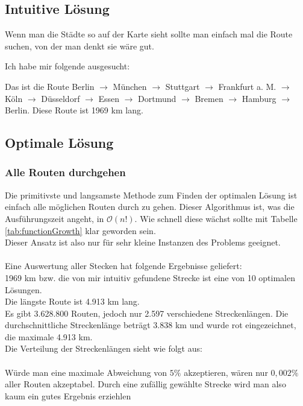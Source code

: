 \documentclass[a4paper,9pt]{scrartcl}
\begin{document}
  \subsection{Intuitive Lösung}
    Wenn man die Städte so auf der Karte sieht sollte man einfach mal die Route
    suchen, von der man denkt sie wäre gut. \\
    \begin{center}
    \end{center}
    Ich habe mir folgende ausgesucht:\\
    \begin{center}
    \end{center}
    Das ist die Route Berlin $\rightarrow$ München $\rightarrow$ Stuttgart
    $\rightarrow$ Frankfurt a. M. $\rightarrow$ Köln $\rightarrow$ Düsseldorf
    $\rightarrow$ Essen $\rightarrow$ Dortmund $\rightarrow$ Bremen
    $\rightarrow$ Hamburg $\rightarrow$ Berlin.
    Diese Route ist 1969 km lang.

  \newpage
  \subsection{Optimale Lösung}
  \subsubsection{Alle Routen durchgehen}
    Die primitivste und langsamste Methode zum Finden der optimalen Lösung ist
    einfach alle möglichen Routen durch zu gehen. Dieser Algorithmus ist, was
    die Ausführungszeit angeht, in $\mathcal{O}(n!)$. Wie schnell diese wächst
    sollte mit Tabelle \ref{tab:functionGrowth} klar geworden sein.\\
    Dieser Ansatz ist also nur für sehr kleine Instanzen des Problems geeignet.\\
    \\
    Eine Auswertung aller Stecken hat folgende Ergebnisse geliefert: \\
    1969 km bzw. die von mir intuitiv gefundene Strecke ist eine von 10 optimalen Lösungen.\\
    Die längste Route ist 4.913 km lang.\\
    Es gibt 3.628.800 Routen, jedoch nur 2.597 verschiedene Streckenlängen. Die
    durchschnittliche Streckenlänge beträgt 3.838 km und wurde rot eingezeichnet,
    die maximale 4.913 km.\\
    Die Verteilung der Streckenlängen sieht wie folgt aus:\\
    \\
    Würde man eine maximale Abweichung von $5\%$ akzeptieren, wären nur $0,002\%$
    aller Routen akzeptabel. Durch eine zufällig gewählte Strecke wird man also
    kaum ein gutes Ergebnis erziehlen
\end{document}
